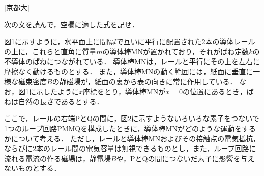 


\noindent
{} [京都大]


次の文を読んで，空欄に適した式を記せ．　

図1に示すように，水平面上に間隔$l$で互いに平行に配置された2本の導体レールの上に，これらと直角に質量$m$の導体棒MNが置かれており，それがばね定数$k$の不導体のばねにつながれている．
導体棒MNは，レールと平行にその上を左右に摩擦なく動けるものとする．
また，導体棒MNの動く範囲には，紙面に垂直に一様な磁束密度$B$の静磁場が，紙面の裏から表の向きに常に作用している．
なお，図1に示したように$x$座標をとり，導体棒MNが$x = 0$の位置にあるとき，ばねは自然の長さであるとする．


ここで，レールの右端PとQの間に，図2に示すようないろいろな素子をつないで1つのループ回路PMMQを構成したときに，導体棒MNがどのような運動をするかについて考える．
ただし，レールと導体棒MNおよびその接触点の電気抵抗，ならびに2本のレール間の電気容量は無視できるものとし，また，ループ回路に流れる電流の作る磁場は，静電場$B$や，PとQの間につないだ素子に影響を与えないものとする．

